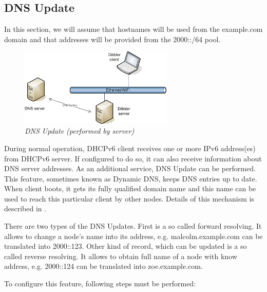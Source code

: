 \subsection{DNS Update}
\label{features-fqdn}
\Note In this section, we will assume that hostnames will be used
from the example.com domain and that addresses will be provided from the
2000::/64 pool. 

\begin{figure}[ht]
\begin{center}
\includegraphics[width=0.65\textwidth]{dibbler-fqdn-srv-update}
\caption{\emph{DNS Update (performed by server)}}
\end{center}
\end{figure}

During normal operation, DHCPv6 client receives one or more IPv6 address(es)
from DHCPv6 server. If configured to do so, it can also receive
information about DNS server addresses. As an additional service, DNS
Update can be performed. This feature, sometimes known as Dynamic DNS,
keeps DNS entries up to date. When client boots, it gets its fully
qualified domain name and this name can be used to reach this
particular client by other nodes. Details of this mechanism is described
in \cite{rfc4704}.

There are two types of the DNS Updates. First is a so called forward
resolving. It allows to change a node's name into its address,
e.g. malcolm.example.com can be translated into 2000::123. Other kind
of record, which can be updated is a so called reverse resolving. It
allows to obtain full name of a node with know address, e.g. 2000::124
can be translated into zoe.example.com.

To configure this feature, following steps must be performed:

